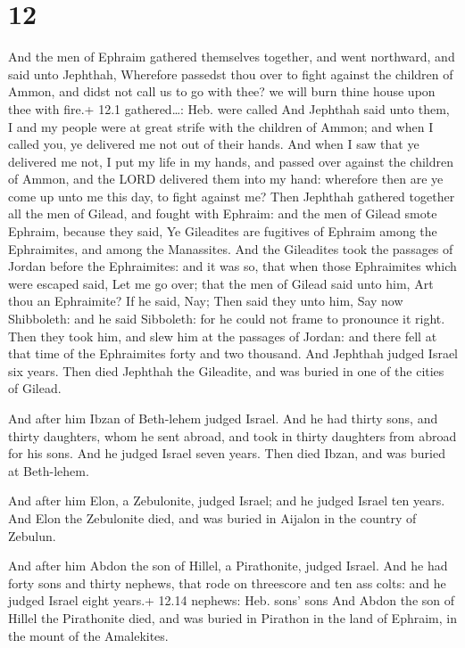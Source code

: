 \hypertarget{section-11}{%
\section{12}\label{section-11}}

 And the men of Ephraim gathered themselves together, and
went northward, and said unto Jephthah, Wherefore passedst thou over to
fight against the children of Ammon, and didst not call us to go with
thee? we will burn thine house upon thee with fire.+ 12.1
gathered\ldots: Heb. were called  And Jephthah said unto
them, I and my people were at great strife with the children of Ammon;
and when I called you, ye delivered me not out of their hands.
 And when I saw that ye delivered me not, I put my life in
my hands, and passed over against the children of Ammon, and the LORD
delivered them into my hand: wherefore then are ye come up unto me this
day, to fight against me?  Then Jephthah gathered together
all the men of Gilead, and fought with Ephraim: and the men of Gilead
smote Ephraim, because they said, Ye Gileadites are fugitives of Ephraim
among the Ephraimites, and among the Manassites.  And the
Gileadites took the passages of Jordan before the Ephraimites: and it
was so, that when those Ephraimites which were escaped said, Let me go
over; that the men of Gilead said unto him, Art thou an Ephraimite? If
he said, Nay;  Then said they unto him, Say now Shibboleth:
and he said Sibboleth: for he could not frame to pronounce it right.
Then they took him, and slew him at the passages of Jordan: and there
fell at that time of the Ephraimites forty and two thousand.
 And Jephthah judged Israel six years. Then died Jephthah
the Gileadite, and was buried in one of the cities of Gilead.

 And after him Ibzan of Beth-lehem judged Israel.
 And he had thirty sons, and thirty daughters, whom he sent
abroad, and took in thirty daughters from abroad for his sons. And he
judged Israel seven years.  Then died Ibzan, and was buried
at Beth-lehem.

 And after him Elon, a Zebulonite, judged Israel; and he
judged Israel ten years.  And Elon the Zebulonite died, and
was buried in Aijalon in the country of Zebulun.

 And after him Abdon the son of Hillel, a Pirathonite,
judged Israel.  And he had forty sons and thirty nephews,
that rode on threescore and ten ass colts: and he judged Israel eight
years.+ 12.14 nephews: Heb. sons' sons  And Abdon the son
of Hillel the Pirathonite died, and was buried in Pirathon in the land
of Ephraim, in the mount of the Amalekites.

